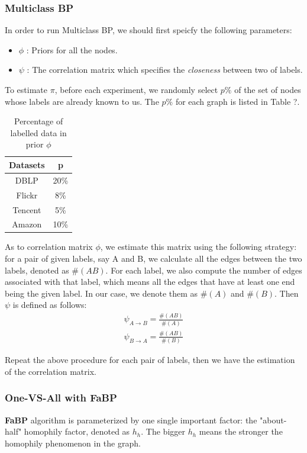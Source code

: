 \subsubsection*{Multiclass BP}
In order to run Multiclass BP, we should first speicfy the following parameters:
\begin{itemize}
	\item \textbf{$\phi$} : Priors for all the nodes.
	\item \textbf{$\psi$} : The correlation matrix which specifies the \textit{closeness} between two of labels. 
\end{itemize}

To estimate $\pi$, before each experiment, we randomly select $p\%$ of the set of nodes whose labels are already known to us. The $p\%$ for each graph is listed in Table ?.

\begin{table}[!ht]
\centering
\begin{tabular}{c|c}
\toprule
\textbf{Datasets} & \textbf{p}\\
\midrule
DBLP & 20\%\\
Flickr & 8\%\\
Tencent & 5\%\\
Amazon & 10\%\\
\bottomrule
\end{tabular}
\caption{Percentage of labelled data in prior $\phi$}
\end{table} 

As to correlation matrix $\phi$, we estimate this matrix using the following strategy: for a pair of given labels, say A and B, we calculate all the edges between the two labels, denoted as $\#(AB)$. For each label, we also compute the number of edges associated with that label, which means all the edges that have at least one end being the given label. In our case, we denote them as $\#(A)$ and $\#(B)$. Then $\psi$ is defined as follows:
\begin{gather*}
	\psi_{A\rightarrow B} = \frac{\#(AB)}{\#(A)}\\
	\psi_{B\rightarrow A} = \frac{\#(AB)}{\#(B)}
\end{gather*}

Repeat the above procedure for each pair of labels, then we have the estimation of the correlation matrix.

\subsubsection*{One-VS-All with \textbf{FaBP}}
\textbf{FaBP} algorithm is parameterized by one single important factor: the "about-half" homophily factor, denoted as $h_h$. The bigger $h_h$ means the stronger the homophily phenomenon in the graph.

